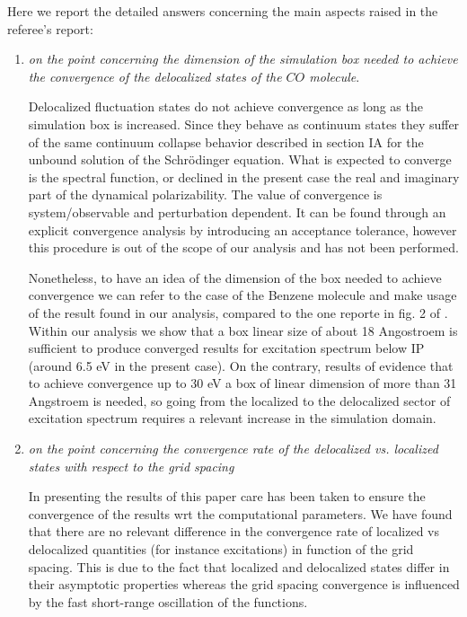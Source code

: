 \documentclass[11pt,a4paper]{article}
\begin{document}
Here we report the detailed answers concerning the main aspects raised in the referee's report:
\begin{enumerate}
  \item \emph{on the point concerning the dimension of the simulation box needed to achieve the convergence of the delocalized states of the $CO$ molecule}. 
  
  Delocalized fluctuation states do not achieve convergence as long as the simulation box is increased. Since they behave as continuum states they suffer of the same continuum collapse behavior described in section IA for the unbound solution of the Schr\"odinger equation. What is expected to converge is the spectral function, or declined in the present case the real and imaginary part of the dynamical polarizability. 
  The value of convergence is system/observable and perturbation dependent. It can be found through an explicit convergence analysis by introducing an acceptance tolerance, however this procedure is out of the scope of our analysis and has not been performed. 
  
  Nonetheless, to have an idea of the dimension of the box needed to achieve convergence we can refer to the case of the Benzene molecule and make usage
  of the result found in our analysis, compared to the one reporte in fig. 2 of \cite{baroni2008}. Within our analysis we show that a box linear size of about 18 Angostroem is sufficient to produce converged results for excitation spectrum below IP (around 6.5 eV in the present case). On the contrary, results of \cite{baroni2008} evidence that to achieve convergence up to 30 eV a box of linear dimension of more than 31 Angstroem is needed, so going from the localized to the delocalized sector of excitation spectrum requires a relevant increase in the simulation domain. 
  
  \item \emph{on the point concerning the convergence rate of the delocalized vs. localized states with respect
  to the grid spacing}
  
 In presenting the results of this paper care has been taken to ensure the convergence of the results wrt the computational parameters. We have found that there are no relevant difference in the convergence rate of localized vs delocalized quantities (for instance excitations) in function of the grid spacing. This is due to the fact that localized and delocalized states differ in their asymptotic properties whereas the grid spacing convergence is influenced by the fast short-range oscillation of the functions.
 

\end{enumerate}
\end{document}
